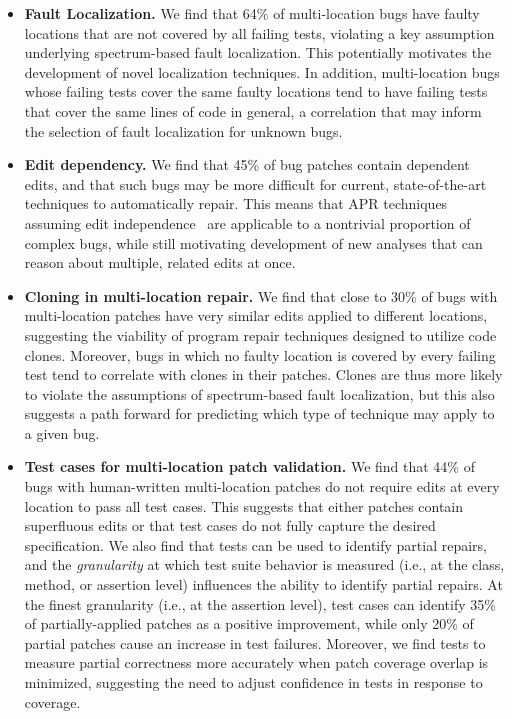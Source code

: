 \documentclass[10pt,journal,compsoc]{IEEEtran}
\newcommand\bears{\textsc{Bears}\xspace}
\begin{document}
\begin{itemize}
\item \textbf{Fault Localization.}  We find that 64\% of multi-location bugs have faulty 
locations that are not
  covered by all failing tests, violating a key assumption underlying
  spectrum-based fault localization. This potentially 
  motivates the development of novel localization techniques. 
  In addition, multi-location bugs whose failing tests cover the same faulty locations tend to 
  have failing tests that cover the same lines of code in general, a correlation
  that may inform the selection of fault localization for unknown bugs. 
\item \textbf{Edit dependency.} We 
find that 45\% of bug patches contain dependent edits, and that such bugs
may be more difficult for current, state-of-the-art
techniques to automatically repair.  This means that APR techniques assuming edit
independence~\cite{saha2019harnessing} are applicable to a nontrivial proportion of complex bugs, while
still motivating development of new analyses that can reason about multiple,
related edits at once. 
\item \textbf{Cloning in multi-location repair.} We find that close to 30\% of bugs with multi-location
patches have very similar edits applied to different locations, suggesting the viability of 
program repair techniques designed to utilize code clones. Moreover, bugs in which 
no faulty location is covered by every failing test tend to correlate with
clones in their patches.  
Clones are thus more likely to violate the assumptions of spectrum-based fault 
localization, but this also suggests a path forward for predicting 
which type of technique may apply to a given bug. 
\item \textbf{Test cases for multi-location patch validation.}
  We find that 44\% of bugs with human-written multi-location patches do not
  require edits at every location to pass all test cases. This suggests that
  either patches contain superfluous edits or that test cases do not fully
  capture the desired specification. We also find that tests can be used to
  identify partial repairs, and the \emph{granularity} at which test suite
  behavior is measured (i.e., at the class, method, or assertion level)
  influences the ability to identify partial repairs. At the finest granularity
  (i.e., at the assertion level), test cases can identify 35\% of
  partially-applied patches as a positive improvement, while only 20\% of
  partial patches cause an increase in test failures. Moreover, we find 
  tests to measure partial correctness more accurately when patch coverage 
  overlap is minimized, suggesting the need to adjust confidence in tests
  in response to coverage.
\end{itemize}
\end{document}
